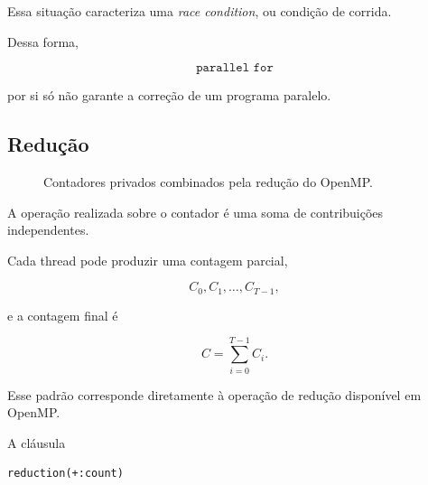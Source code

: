 Essa situação caracteriza uma \textit{race condition}, ou condição de
corrida.

Dessa forma,

\[
\texttt{parallel for}
\]

por si só não garante a correção de um programa paralelo.


\subsection{Redução}

\begin{figure}[htbp]
    \centering
    \caption{Contadores privados combinados pela redução do OpenMP.}
    \label{fig:atvd05-reduction}
\end{figure}

A operação realizada sobre o contador é uma soma de contribuições
independentes.

Cada thread pode produzir uma contagem parcial,

\[
C_0,C_1,\ldots,C_{T-1},
\]

e a contagem final é

\[
C =
\sum_{i=0}^{T-1} C_i.
\]

Esse padrão corresponde diretamente à operação de redução disponível em
OpenMP.

A cláusula

\begin{verbatim}
reduction(+:count)
\end{verbatim}

